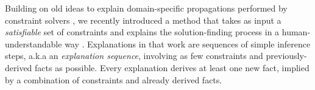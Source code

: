 \documentclass[a4paper,UKenglish,cleveref, autoref, thm-restate, pdfa]{lipics-v2021}
\renewcommand\comment[1]{#1}
\newcommand{\emilio}[1]{{\comment{\color{red}Emilio: #1}}}
\newcommand{\bart}[1]{{\comment{\color{OliveGreen}Bart: #1}}}
\begin{document}
%





Building on old ideas to explain domain-specific propagations performed by constraint solvers \cite{sqalli1996inference,freuder2001explanation}, we recently introduced a method that takes as input a \emph{satisfiable} set of constraints
and explains the solution-finding process in a human-understandable way \cite{ecai/BogaertsGCG20}. 
Explanations in that work are sequences of simple inference steps, a.k.a an \emph{explanation sequence}, involving as few constraints and previously-derived facts as possible. Every explanation derives at least one new fact, implied by a combination of constraints and already derived facts.
\end{document}
